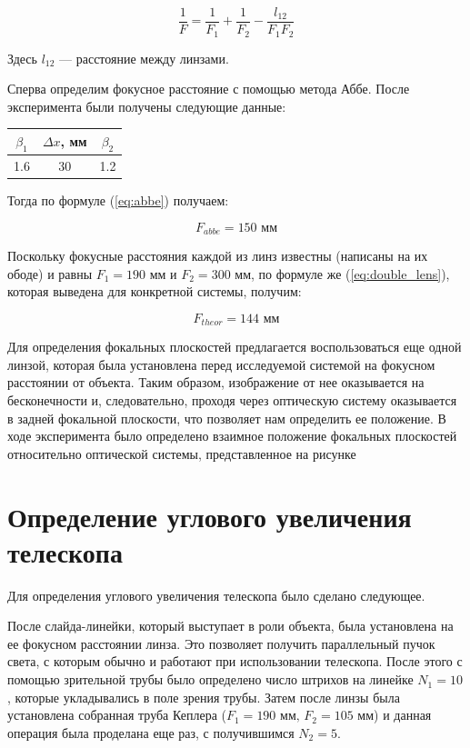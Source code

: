 \documentclass[a4paper, 12pt]{article}
\begin{document}
\begin{equation}
	\frac{1}{F} = \frac{1}{F_1} + \frac{1}{F_2} - \frac{l_{12}}{F_1 F_2}
	\label{eq:double_lens}
\end{equation}

Здесь $l_{12}$ --- расстояние между линзами.

Сперва определим фокусное расстояние с помощью метода Аббе. После эксперимента были получены следующие данные:

\begin{center}
	\begin{tabular}{|c|c|c|}
		\hline
		$\beta_1$ & $\Delta x$, мм & $\beta_2$ \\
		\hline
		1.6 & 30 & 1.2 \\
		\hline
	\end{tabular}
\end{center}

Тогда по формуле (\ref{eq:abbe}) получаем:

\begin{equation*}
	\boxed{F_{abbe} = 150 \text{ мм}}
\end{equation*}

Поскольку фокусные расстояния каждой из линз известны (написаны на их ободе) и равны $F_1 = 190 \text{ мм}$ и $F_2 = 300 \text{ мм}$, по формуле же (\ref{eq:double_lens}), которая выведена для конкретной системы, получим:

\begin{equation*}
	\boxed{F_{theor} = 144 \text{ мм}}
\end{equation*}

Для определения фокальных плоскостей предлагается воспользоваться еще одной линзой, которая была установлена перед исследуемой системой на фокусном расстоянии от объекта. Таким образом, изображение от нее оказывается на бесконечности и, следовательно, проходя через оптическую систему оказывается в задней фокальной плоскости, что позволяет нам определить ее положение. В ходе эксперимента было определено взаимное положение фокальных плоскостей относительно оптической системы, представленное на рисунке %

\section{Определение углового увеличения телескопа}

Для определения углового увеличения телескопа было сделано следующее.

После слайда-линейки, который выступает в роли объекта, была установлена на ее фокусном расстоянии линза. Это позволяет получить параллельный пучок света, с которым обычно и работают при использовании телескопа. После этого с помощью зрительной трубы было определено число штрихов на линейке $N_1 = 10$, которые укладывались в поле зрения трубы. Затем после линзы была установлена собранная труба Кеплера ($F_1 = 190 \text{ мм, } F_2 = 105 \text{ мм}$) и данная операция была проделана еще раз, с получившимся $N_2 = 5$.
\end{document}
